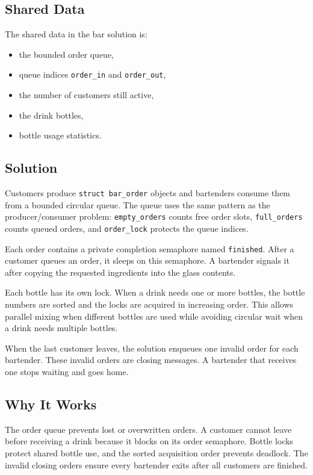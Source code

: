 \documentclass[12pt,a4paper]{article}
\begin{document}
\subsection{Shared Data}

The shared data in the bar solution is:

\begin{itemize}
    \item the bounded order queue,
    \item queue indices \texttt{order\_in} and \texttt{order\_out},
    \item the number of customers still active,
    \item the drink bottles,
    \item bottle usage statistics.
\end{itemize}

\subsection{Solution}

Customers produce \texttt{struct bar\_order} objects and bartenders consume
them from a bounded circular queue. The queue uses the same pattern as the
producer/consumer problem: \texttt{empty\_orders} counts free order slots,
\texttt{full\_orders} counts queued orders, and \texttt{order\_lock} protects
the queue indices.

Each order contains a private completion semaphore named \texttt{finished}.
After a customer queues an order, it sleeps on this semaphore. A bartender
signals it after copying the requested ingredients into the glass contents.

Each bottle has its own lock. When a drink needs one or more bottles, the
bottle numbers are sorted and the locks are acquired in increasing order. This
allows parallel mixing when different bottles are used while avoiding circular
wait when a drink needs multiple bottles.

When the last customer leaves, the solution enqueues one invalid order for each
bartender. These invalid orders are closing messages. A bartender that receives
one stops waiting and goes home.

\subsection{Why It Works}

The order queue prevents lost or overwritten orders. A customer cannot leave
before receiving a drink because it blocks on its order semaphore. Bottle locks
protect shared bottle use, and the sorted acquisition order prevents deadlock.
The invalid closing orders ensure every bartender exits after all customers are
finished.
\end{document}

